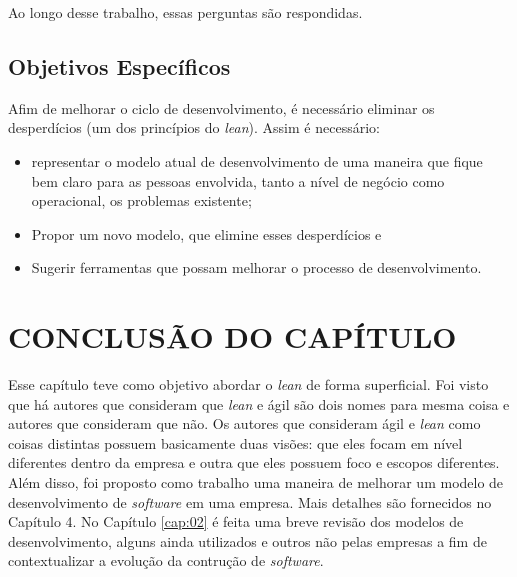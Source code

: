 Ao longo desse trabalho, essas perguntas são respondidas.

\subsection{Objetivos Específicos}

Afim de melhorar o ciclo de desenvolvimento, é necessário eliminar os desperdícios (um dos princípios do \textit{lean}). Assim é necessário:

\begin{itemize}

\item representar o modelo atual de desenvolvimento de uma maneira que fique bem claro para as pessoas envolvida, tanto a nível de negócio como operacional, os problemas existente; 

\item Propor um novo modelo, que elimine esses desperdícios e

\item Sugerir ferramentas que possam melhorar o processo de desenvolvimento.

\end{itemize}


\section{CONCLUSÃO DO CAPÍTULO}

Esse capítulo teve como objetivo abordar o \textit{lean} de forma superficial. Foi visto que há autores que consideram que \textit{lean} e ágil são dois nomes para mesma coisa e autores que consideram que não. Os autores que consideram ágil e \textit{lean} como coisas distintas possuem basicamente duas visões: que eles focam em nível diferentes dentro da empresa e outra que eles possuem foco e escopos diferentes. Além disso, foi proposto como trabalho uma maneira de melhorar um modelo de desenvolvimento de \textit{software} em uma empresa. Mais detalhes são fornecidos no Capítulo 4. No Capítulo \ref{cap:02} é feita uma breve revisão dos modelos de desenvolvimento, alguns ainda utilizados e outros não pelas empresas a fim de contextualizar a evolução da contrução de \textit{software}.
